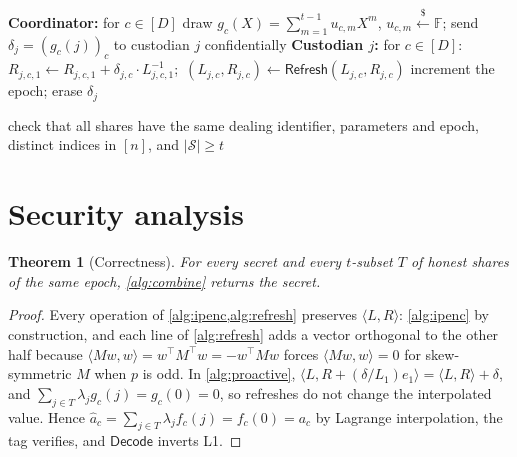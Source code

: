 \documentclass[10.5pt,a4paper]{article}
\theoremstyle{plain}
\newtheorem{theorem}{Theorem}
\theoremstyle{definition}
\newcommand{\F}{\mathbb{F}}
\newcommand{\ip}[2]{\langle #1,#2\rangle}
\newcommand{\getsr}{\xleftarrow{\$}}
\begin{document}
\begin{algorithm}[t]
\caption{$\mathsf{ProactiveRefresh}$ for a dealing with parameters $(t,n,D)$}\label{alg:proactive}
\textbf{Coordinator:} for $c\in[D]$ draw $g_c(X)=\sum_{m=1}^{t-1}u_{c,m}X^m$, $u_{c,m}\getsr\F$; send $\delta_j=(g_c(j))_c$ to custodian $j$ confidentially\;
\textbf{Custodian $j$:} for $c\in[D]$: $R_{j,c,1}\gets R_{j,c,1}+\delta_{j,c}\cdot L_{j,c,1}^{-1}$;\ $(L_{j,c},R_{j,c})\gets\mathsf{Refresh}(L_{j,c},R_{j,c})$\;
increment the epoch; erase $\delta_j$\;
\end{algorithm}

\begin{algorithm}[t]
\caption{$\mathsf{Combine}(\text{shares } \mathcal{S})$}\label{alg:combine}
check that all shares have the same dealing identifier, parameters and epoch, distinct indices in $[n]$, and $|\mathcal S|\ge t$\;
\Return{$\bot$}
\end{algorithm}

\section{Security analysis}\label{sec:security}

\begin{theorem}[Correctness]\label{thm:correct}
For every secret and every $t$-subset $T$ of honest shares of the same epoch, \cref{alg:combine} returns the secret.
\end{theorem}
\begin{proof}
Every operation of \cref{alg:ipenc,alg:refresh} preserves $\ip{L}{R}$: \cref{alg:ipenc} by construction, and each line of \cref{alg:refresh} adds a vector orthogonal to the other half because $\ip{Mw}{w}=w^\top M^\top w=-w^\top Mw$ forces $\ip{Mw}{w}=0$ for skew-symmetric $M$ when $p$ is odd. In \cref{alg:proactive}, $\ip{L}{R+(\delta/L_1)e_1}=\ip{L}{R}+\delta$, and $\sum_{j\in T}\lambda_j g_c(j)=g_c(0)=0$, so refreshes do not change the interpolated value. Hence $\hat a_c=\sum_{j\in T}\lambda_jf_c(j)=f_c(0)=a_c$ by Lagrange interpolation, the tag verifies, and $\mathsf{Decode}$ inverts L1.
\end{proof}
\end{document}
